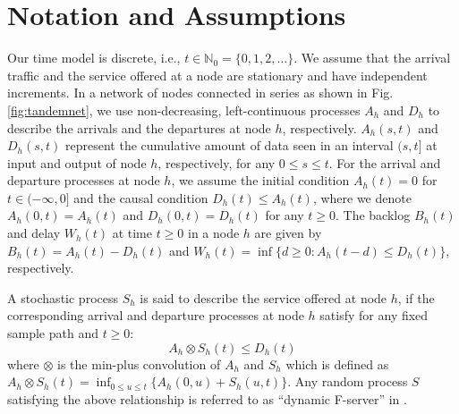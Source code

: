 \documentclass[letterpaper]{IEEEtran}
\begin{document}
\section{Notation and Assumptions}
\label{sec:SNC}
Our time model is discrete, i.e., $t \in \mathbb{N}_0 = \{0, 1, 2, \ldots \}$. We assume that the arrival traffic and the service offered at a node are stationary and have independent increments. In a network of nodes connected in series as shown in Fig. \ref{fig:tandemnet}, we use non-decreasing, left-continuous processes $A_h$ and $D_h$ to describe the arrivals and the departures at node $h$, respectively. $A_h(s,t)$ and $D_h(s,t)$ represent the cumulative amount of data seen in an interval $(s,t]$ at input and output of node $h$, respectively, for any $0 \le s \le t$. For the arrival and departure processes at node $h$, we assume the initial condition $A_h(t) = 0$ for $t \in (-\infty, 0]$ and the causal condition $D_h(t) \le A_h(t)$, where we denote $A_h(0,t) = A_h(t)$ and $D_h(0,t) = D_h(t)$ for any $t \ge 0$. The backlog $B_h(t)$ and delay $W_h(t)$ at time $t \ge 0$ in a node $h$ are given by $B_h(t) = A_h(t) - D_h(t)$ and $W_h(t) = \inf{\{d \ge 0: A_h(t-d) \le D_h(t)\}}$, respectively.

A stochastic process $S_h$ is said to describe the service offered at node $h$, if the corresponding arrival and departure processes at node $h$ satisfy for any fixed sample path and $t \ge 0$:
\begin{equation}
 A_h\otimes S_h(t) \le D_h(t)
 \label{reffsenv}
\end{equation}
where $\otimes$ is the min-plus convolution of $A_h$ and $S_h$ which is defined as $A_h\otimes S_h(t) = \inf_{0 \le u \le t} \{ A_h(0,u) + S_h(u,t)\}$. Any random process $S$ satisfying the above relationship is referred to as ``dynamic F-server'' in \cite{chang:2000}. 
\end{document}
